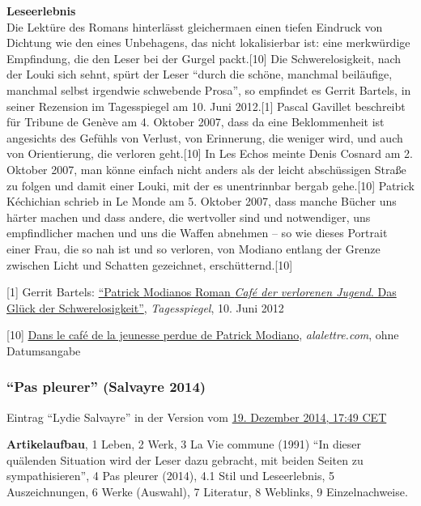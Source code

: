 \documentclass[fontsize=12pt]{scrartcl}
\begin{document}
\textbf{Leseerlebnis}\\
Die Lekt\"ure des Romans hinterl\"asst glei\-cherma\-{\ss}en einen tiefen Eindruck von Dichtung wie den eines Unbehagens, das nicht lokalisierbar ist: eine merkw\"urdige Emp\-fin\-dung, die den Leser bei der Gurgel packt.[10] Die Schwerelosigkeit, nach der Louki sich sehnt, sp\"urt der Leser "`durch die sch\"one, manchmal beil\"aufige, manchmal \mbox{selbst} irgendwie schwebende Prosa"', so empfindet es Gerrit Bartels, in seiner Rezension im Tagesspiegel am 10. Juni 2012.[1] Pascal Gavillet beschreibt f\"ur Tribune de Gen\`{e}ve am 4. Oktober 2007, dass da eine Beklommenheit ist angesichts des Ge\-f\"uhls von Verlust, von Erinnerung, die weniger wird, und auch von Orientierung, die verloren geht.[10] In Les Echos meinte Denis Cosnard am 2. Oktober 2007, man k\"onne einfach nicht anders als der leicht absch\"ussigen Stra{\ss}e zu folgen und damit einer Louki, mit der es unentrinnbar bergab gehe.[10] Patrick K\'{e}chichian schrieb in Le Monde am 5. Oktober 2007, dass manche B\"ucher uns h\"arter machen und dass andere, die wertvoller sind und notwendiger, uns empfindlicher machen und uns die Waffen abnehmen -- so wie dieses Portrait einer Frau, die so nah ist und so verloren, von Modiano entlang der Grenze zwischen Licht und Schatten ge\-zeichnet, ersch\"utternd.[10]

{\tiny[1] Gerrit Bartels: \href{http://www.tagesspiegel.de/kultur/patrick-modianos-roman-cafe-der-verlorenen-jugend-das-glueck-der-schwerelosigkeit/6730142.html}{"`Patrick Modianos Roman \textit{Caf\'{e} der verlorenen Jugend}. Das Gl\"uck der Schwerelosigkeit"'}, \textit{Tagesspiegel}, 10. Juni 2012\par}
{\tiny[10] \href{http://www.alalettre.com/actualite-modiano-jeunesse-perdue.php}{Dans le caf\'{e} de la jeunesse perdue de Patrick Modiano}, \textit{alalettre.com}, ohne Datumsangabe\par}

\subsubsection{"`Pas pleurer"' (Salvayre 2014)}
\label{subsubsec:6.1.4}

Eintrag "`Lydie Salvayre"' in der Version vom \href{https://de.wikipedia.org/w/index.php?title=Lydie_Salvayre\&oldid=136929747}{19. Dezember 2014, 17:49 CET}

\textbf{Artikelaufbau}, 1 Leben, 2 Werk, 3 La Vie commune (1991) "`In dieser qu\"alenden Situation wird der Leser dazu gebracht, mit beiden Sei\-ten zu sympathisieren"', 4 Pas pleurer (2014), 4.1 Stil und Leseerlebnis, 5 Auszeichnungen, 6 Werke (Auswahl), 7 Li\-te\-ra\-tur, 8 Weblinks, 9 Einzelnachweise.
\end{document}
